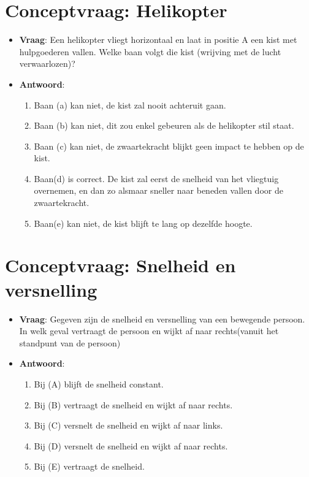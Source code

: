 \documentclass[12pt]{report}
\begin{document}
\section{Conceptvraag: Helikopter}
\begin{itemize}
\item {\textbf{Vraag}: Een helikopter vliegt horizontaal en laat in positie A een kist met hulpgoederen vallen. Welke baan volgt die kist (wrijving met de lucht verwaarlozen)?}
\item {\textbf{Antwoord}: \begin{enumerate}
    \item {Baan (a) kan niet, de kist zal nooit achteruit gaan.}
    \item {Baan (b) kan niet, dit zou enkel gebeuren als de helikopter stil staat.}
    \item {Baan (c) kan niet, de zwaartekracht blijkt geen impact te hebben op de kist.}
    \item {Baan(d) is correct. De kist zal eerst de snelheid van het vliegtuig overnemen, en dan zo alsmaar sneller
        naar beneden vallen door de zwaartekracht.}
    \item {Baan(e) kan niet, de kist blijft te lang op dezelfde hoogte.}
    \end{enumerate}}
\end{itemize}


\section{Conceptvraag: Snelheid en versnelling}
\begin{itemize}
\item {\textbf{Vraag}: Gegeven zijn de snelheid en versnelling van een bewegende persoon. In welk geval vertraagt de persoon en wijkt af naar rechts(vanuit het standpunt van de persoon)}
\item {\textbf{Antwoord}: \begin{enumerate}
    \item {Bij (A) blijft de snelheid constant.}
    \item {Bij (B) vertraagt de snelheid en wijkt af naar rechts.}
    \item {Bij (C) versnelt de snelheid en wijkt af naar links.}
    \item {Bij (D) versnelt de snelheid en wijkt af naar rechts.}
      \item {Bij (E) vertraagt de snelheid.}
    \end{enumerate}}
\end{itemize}
\end{document}
